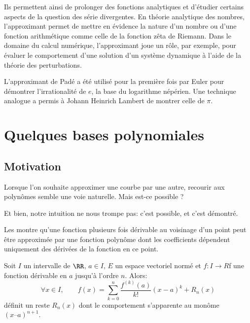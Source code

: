 Ils permettent ainsi de prolonger des fonctions analytiques et d'étudier certains aspects de la question des 
série divergentes.
En théorie analytique des nombres, l'approximant permet de mettre en évidence la nature d'un nombre ou 
d'une fonction arithmétique comme celle de la fonction zêta de Riemann. 
Dans le domaine du calcul numérique, l'approximant joue un rôle, par exemple, pour évaluer le comportement 
d'une solution d'un système dynamique à l'aide de la théorie des perturbations.

L'approximant de Padé a été utilisé pour la première fois par Euler 
pour démontrer l'irrationalité de $e$, la base du logarithme népérien. 
Une technique analogue a permis à Johann Heinrich Lambert 
de montrer celle de $\pi$.%







\medskip
\section{Quelques bases polynomiales}

\medskip
\subsection{Motivation}

Lorsque l'on souhaite approximer une courbe par une autre, recourir aux polynômes semble
une voie naturelle.
Mais est-ce possible ?

\medskip
Et bien, notre intuition ne nous trompe pas: c'est possible, et c'est démontré.

Les 
montre qu'une fonction plusieurs fois dérivable au voisinage d'un point peut être approximée 
par une fonction polynôme dont les coefficients dépendent uniquement des dérivées de la fonction 
en ce point.

\begin{theoreme}
Soit $I$ un intervalle de $\RR$, $a\in I$, $E$ un espace vectoriel normé et $f: I\rightarrow R$f une fonction dérivable en $a$ 
jusqu’à l’ordre $n$. Alors:
\begin{equation}
\forall x\in I, \qquad
f(x) =\sum_{k=0}^n \frac{f^{(k)}(a)}{k!}(x-a)^k + R_n(x)
\end{equation}
définit un reste $R_n(x)$ dont le comportement s’apparente au monôme $(x – a)^{n + 1}$.
\end{theoreme}

